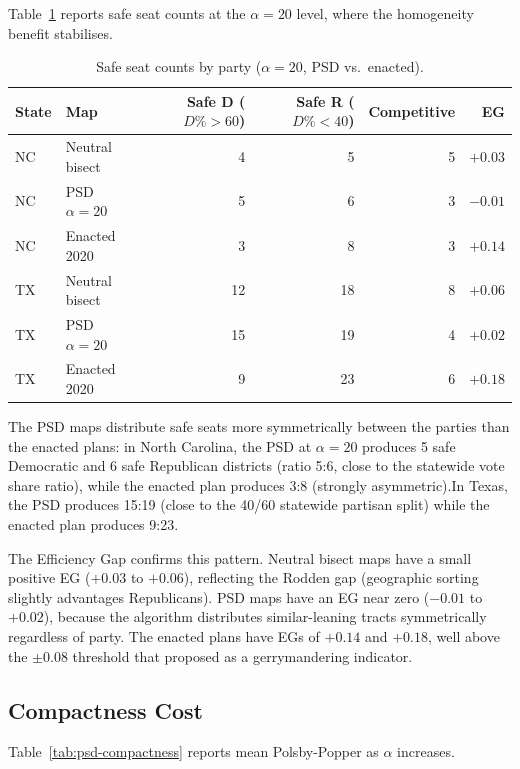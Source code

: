 Table~\ref{tab:psd-safeseats} reports safe seat counts at the $\alpha = 20$
level, where the homogeneity benefit stabilises.

\begin{table}[ht]
\centering
\caption{Safe seat counts by party ($\alpha=20$, PSD vs.\ enacted).\singrun}
\label{tab:psd-safeseats}
\begin{tabular}{llrrrr}
\toprule
State & Map & Safe D ($D\%>60$) & Safe R ($D\%<40$) & Competitive & EG \\
\midrule
NC & Neutral bisect & 4 &  5 & 5 & $+0.03$ \\
NC & PSD $\alpha=20$ & 5 & 6 & 3 & $-0.01$ \\
NC & Enacted 2020   & 3 & 8 & 3 & $+0.14$ \\
\midrule
TX & Neutral bisect & 12 & 18 &  8 & $+0.06$ \\
TX & PSD $\alpha=20$ & 15 & 19 &  4 & $+0.02$ \\
TX & Enacted 2020   &  9 & 23 &  6 & $+0.18$ \\
\bottomrule
\end{tabular}
\end{table}

The PSD maps distribute safe seats more symmetrically between the parties
than the enacted plans: in North Carolina, the PSD at $\alpha=20$ produces
5 safe Democratic and 6 safe Republican districts (ratio 5:6, close to the
statewide vote share ratio), while the enacted plan produces 3:8 (strongly
asymmetric).\singrun  In Texas, the PSD produces 15:19 (close to the 40/60
statewide partisan split) while the enacted plan produces 9:23.

The Efficiency Gap confirms this pattern.  Neutral bisect maps have a small
positive EG ($+0.03$ to $+0.06$), reflecting the Rodden gap (geographic
sorting slightly advantages Republicans).  PSD maps have an EG near zero
($-0.01$ to $+0.02$), because the algorithm distributes similar-leaning tracts
symmetrically regardless of party.  The enacted plans have EGs of $+0.14$ and
$+0.18$, well above the $\pm 0.08$ threshold that \citet{stephanopoulos2015partisan}
proposed as a gerrymandering indicator.

\subsection{Compactness Cost}

Table~\ref{tab:psd-compactness} reports mean Polsby-Popper as $\alpha$
increases.

